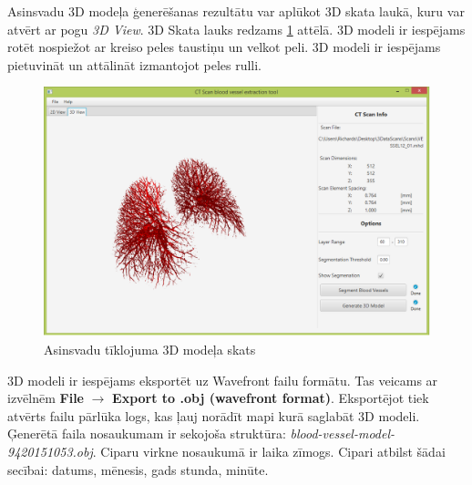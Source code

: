 Asinsvadu 3D modeļa ģenerēšanas rezultātu var aplūkot 3D skata laukā, kuru var atvērt ar pogu \emph{3D View}. 3D Skata lauks redzams \ref{fig:3D-view} attēlā. 3D modeli ir iespējams rotēt nospiežot ar kreiso peles taustiņu un velkot peli. 3D modeli ir iespējams pietuvināt un attālināt izmantojot peles rulli.
\begin{figure}[h]
\begin{center}
\includegraphics[scale=0.45]{img/vessels-3D.png}
\caption{Asinsvadu tīklojuma 3D modeļa skats}
\label{fig:3D-view}
\end{center}
\end{figure}

3D modeli ir iespējams eksportēt uz Wavefront failu formātu. Tas veicams ar izvēlnēm \textbf{File} $\rightarrow$ \textbf{Export to .obj (wavefront format)}. Eksportējot tiek atvērts failu pārlūka logs, kas ļauj norādīt mapi kurā saglabāt 3D modeli. Ģenerētā faila nosaukumam ir sekojoša struktūra: \emph{blood-vessel-model-9420151053.obj}. Ciparu virkne nosaukumā ir laika zīmogs. Cipari atbilst šādai secībai: datums, mēnesis, gads stunda, minūte.


